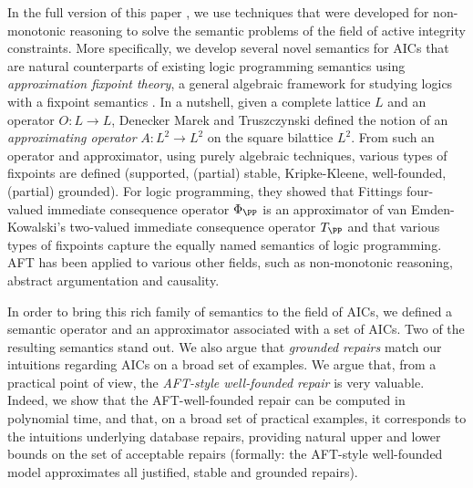 \documentclass[runningheads]{llncs}
\begin{document}
In the full version of this paper , we use techniques that were developed for non-monotonic reasoning to solve the semantic problems of the field of active integrity constraints. 
More specifically, we develop several novel semantics for AICs that are natural counterparts of existing logic programming semantics using \emph{approximation fixpoint theory}, a general algebraic framework for studying logics with a fixpoint semantics \cite{DeneckerMT00}.
In a nutshell, given a complete lattice $L$ and an operator $O:L\to L$, Denecker Marek and Truszczynski \cite{DeneckerMT00} defined the notion of an \emph{approximating operator} $A: L^2\to L^2$ on the square bilattice $L^2$. 
From such an operator and approximator, using purely algebraic techniques, various types of fixpoints are defined (supported, (partial) stable, Kripke-Kleene, well-founded, (partial) grounded). 
For logic programming, they showed that Fittings four-valued immediate consequence operator $\Phi_\PP$ is an approximator of van Emden-Kowalski's two-valued immediate consequence operator $T_\PP$ and that various types of fixpoints capture the equally named semantics of logic programming.
AFT has been applied to various other fields, such as non-monotonic reasoning, abstract argumentation and causality. 

In order to bring this rich family of semantics to the field of AICs, we defined a semantic operator and an approximator associated with a set of AICs. Two of the resulting semantics stand out.
We also argue that \emph{grounded repairs} match our intuitions regarding AICs on a broad set of examples. 
We argue that, from a practical point of view, the \emph{AFT-style well-founded repair} is very valuable. 
Indeed, we show that the AFT-well-founded repair can be computed in polynomial time, and that, on a broad set of practical examples, it corresponds to the intuitions underlying database repairs,  providing natural upper and lower bounds on the set of acceptable repairs (formally: the AFT-style well-founded model approximates all justified, stable and grounded repairs).
\end{document}
